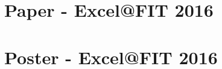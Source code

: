 \chapter{Paper - Excel@FIT 2016}



\chapter{Poster - Excel@FIT 2016}

\begin{figure}[htp] 
\end{figure}